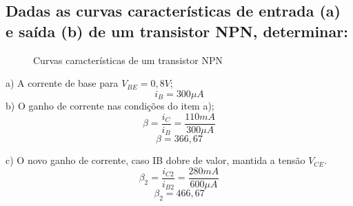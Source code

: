 \subsection{Dadas as curvas características de entrada (a) e saída (b) de um transistor NPN, determinar:}

\begin{figure}[h!]
\hspace*{\fill}
\caption{Curvas características de um transistor NPN}
\end{figure}

\noindent a) A corrente de base para $V_{BE} = 0,8 V$;
\begin{equation} i_B = 300 \mu A \label{eq0}\end{equation}
\noindent b) O ganho de corrente nas condições do item a);
\begin{equation} \beta = \frac{i_C}{i_B}  = \frac{110 mA}{300 \mu A} \label{eq1}\end{equation}
\begin{equation} \beta = 366,67 \label{eq2}\end{equation}

\noindent c) O novo ganho de corrente, caso IB dobre de valor, mantida a tensão $V_{CE}$.
\begin{equation} \beta_2 = \frac{i_{C2}}{i_{B2}}  = \frac{280 mA}{600 \mu A} \label{eq3}\end{equation}
\begin{equation} \beta_2 = 466,67 \label{eq4}\end{equation}
  

